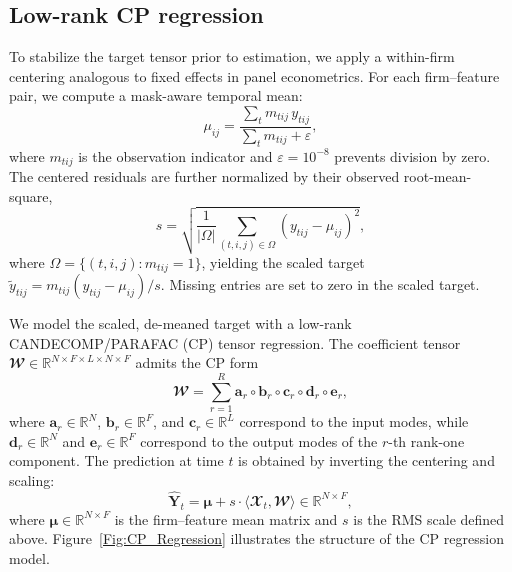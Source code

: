 \documentclass[pdflatex,sn-mathphys-num]{sn-jnl}%
\theoremstyle{thmstyleone}%
\theoremstyle{thmstyletwo}%
\theoremstyle{thmstylethree}%
\begin{document}
\subsection{Low-rank CP regression}
\label{Section:CP_Structured}

To stabilize the target tensor prior to estimation, we apply a within-firm centering analogous to fixed effects in panel econometrics. For each firm--feature pair, we compute a mask-aware temporal mean:
\begin{equation}
\mu_{ij} = \frac{\sum_{t} m_{tij}\, y_{tij}}{\sum_{t} m_{tij} + \varepsilon},
\end{equation}
where $m_{tij}$ is the observation indicator and $\varepsilon = 10^{-8}$ prevents division by zero. The centered residuals are further normalized by their observed root-mean-square,
\begin{equation}
s = \sqrt{\frac{1}{|\Omega|}\sum_{(t,i,j)\in\Omega}(y_{tij}-\mu_{ij})^2},
\end{equation}
where $\Omega = \{(t,i,j): m_{tij}=1\}$, yielding the scaled target $\tilde{y}_{tij} = m_{tij}(y_{tij}-\mu_{ij})/s$. Missing entries are set to zero in the scaled target.

We model the scaled, de-meaned target with a low-rank CANDECOMP/PARAFAC (CP) tensor regression. The coefficient tensor $\mathbfcal{W} \in \mathbb{R}^{N \times F \times L \times N \times F}$ admits the CP form
\begin{equation}
\mathbfcal{W} = \sum_{r=1}^{R} \mathbf{a}_r \circ \mathbf{b}_r \circ \mathbf{c}_r \circ \mathbf{d}_r \circ \mathbf{e}_r,
\end{equation}
where $\mathbf{a}_r \in \mathbb{R}^N$, $\mathbf{b}_r \in \mathbb{R}^F$, and $\mathbf{c}_r \in \mathbb{R}^L$ correspond to the input modes, while $\mathbf{d}_r \in \mathbb{R}^N$ and $\mathbf{e}_r \in \mathbb{R}^F$ correspond to the output modes of the $r$-th rank-one component. The prediction at time $t$ is obtained by inverting the centering and scaling:
\begin{equation}
\widehat{\mathbf{Y}}_t = \boldsymbol{\mu} + s \cdot \langle \mathbfcal{X}_t, \mathbfcal{W} \rangle \in \mathbb{R}^{N \times F},
\end{equation}
where $\boldsymbol{\mu} \in \mathbb{R}^{N \times F}$ is the firm--feature mean matrix and $s$ is the RMS scale defined above. Figure~\ref{Fig:CP_Regression} illustrates the structure of the CP regression model.
\end{document}

